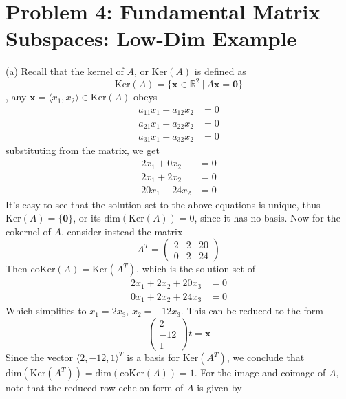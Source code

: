 \documentclass{article}
\begin{document}
\section*{Problem 4: Fundamental Matrix Subspaces: Low-Dim Example}
(a) Recall that the kernel of $A$, or $\text{Ker}(A)$ is defined as
\begin{equation*}
    \text{Ker}(A) = \{\mathbf{x}\in\mathbb{R}^{2} \ | \ A\mathbf{x} = \mathbf{0}\}
\end{equation*}
, any $\mathbf{x} = \langle x_{1},x_{2}\rangle \in \text{Ker}(A)$ obeys 
\begin{align*}
    a_{11}x_{1} + a_{12}x_{2} &= 0\\
    a_{21}x_{1} + a_{22}x_{2} &= 0\\
    a_{31}x_{1} + a_{32}x_{2} &= 0
\end{align*}
 substituting from the matrix, we get
\begin{align*}
    2x_{1} + 0x_{2} &= 0\\
    2x_{1} + 2x_{2} &= 0\\
    20x_{1} + 24x_{2} &= 0
\end{align*}
It's easy to see that the solution set to the above equations is unique, thus $\text{Ker}(A) = \{\mathbf{0}\}$, or its $\text{dim}(\text{Ker}(A)) = 0$, since it has no basis. Now for the cokernel of $A$, consider instead the matrix
\begin{equation*}
    A^{T} = \begin{pmatrix}
        2 & 2 & 20\\
        0 & 2 & 24
    \end{pmatrix}
\end{equation*}
Then $\text{coKer}(A) = \text{Ker}(A^{T})$, which is the solution set of
\begin{align*}
    2x_{1} + 2x_{2} + 20x_{3} &= 0\\
    0x_{1} + 2x_{2} + 24x_{3} &= 0
\end{align*}
Which simplifies to $x_{1} = 2x_{3}$, $x_{2} = -12x_{3}$. This can be reduced to the form
\begin{equation*}
    \begin{pmatrix}
        2\\
        -12\\
        1
    \end{pmatrix}
    t = \mathbf{x}
\end{equation*}
Since the vector $\langle 2, -12, 1 \rangle^{T}$ is a basis for $\text{Ker}(A^{T})$, we conclude that $\text{dim}(\text{Ker}(A^{T})) = \text{dim}(\text{coKer}(A)) = 1$. For the image and coimage of $A$, note that the reduced row-echelon form of $A$ is given by
\end{document}
